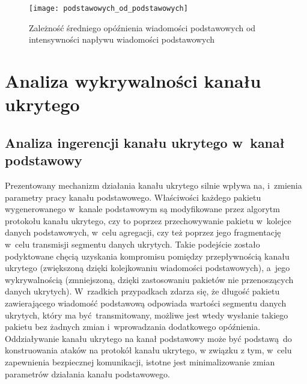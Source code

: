 \documentclass[a4paper, twoside, 12pt]{report}
\begin{document}
        \begin{figure}[h]
                \centering
                \texttt{[image: podstawowych\_od\_podstawowych]}
                \caption{Zależność średniego opóźnienia wiadomości podstawowych od
                    intensywności napływu wiadomości podstawowych}
                \label{OPOZNIENIEPODSTAWOWYCHODPODSTAWOWYCH}
        \end{figure}

\chapter{Analiza wykrywalności kanału ukrytego}
    \section{Analiza ingerencji kanału ukrytego w~kanał podstawowy}
        Prezentowany mechanizm działania kanału ukrytego silnie wpływa na, i~zmienia
        parametry pracy kanału podstawowego. Właściwości każdego pakietu wygenerowanego
        w~kanale podstawowym są modyfikowane przez algorytm protokołu kanału ukrytego,
        czy to poprzez przechowywanie pakietu w~kolejce danych podstawowych, w~celu
        agregacji, czy też
        poprzez jego fragmentację w~celu transmisji segmentu danych ukrytych. Takie podejście
        zostało podyktowane chęcią uzyskania kompromisu pomiędzy przepływnością
        kanału ukrytego (zwiększoną dzięki kolejkowaniu wiadomości podstawowych),
        a~jego wykrywalnością (zmniejszoną, dzięki zastosowaniu pakietów nie przenoszących danych ukrytych).
        W~rzadkich
        przypadkach zdarza się, że długość pakietu zawierającego wiadomość podstawową
        odpowiada wartości segmentu danych ukrytych, który ma być transmitowany,
        możliwe jest wtedy wysłanie takiego pakietu bez żadnych zmian i~wprowadzania
        dodatkowego opóźnienia. Oddziaływanie kanału ukrytego na kanał podstawowy
        może być podstawą do konstruowania ataków na protokół kanału ukrytego, w
        związku z tym, w~celu zapewnienia bezpiecznej komunikacji, istotne jest
        minimalizowanie zmian parametrów działania kanału podstawowego.
\end{document}
